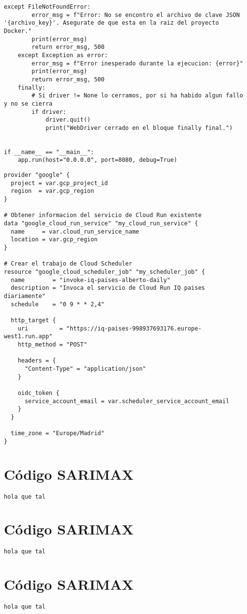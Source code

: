 \begin{lstlisting}[caption = {Código de web scrapping completo.}, label = WBSCode]
    except FileNotFoundError:
        error_msg = f"Error: No se encontro el archivo de clave JSON '{archivo_key}'. Asegurate de que esta en la raiz del proyecto Docker."
        print(error_msg)
        return error_msg, 500
    except Exception as error:
        error_msg = f"Error inesperado durante la ejecucion: {error}"
        print(error_msg)
        return error_msg, 500
    finally:
        # Si driver != None lo cerramos, por si ha habido algun fallo y no se cierra
        if driver:
            driver.quit()
            print("WebDriver cerrado en el bloque finally final.")


if __name__ == "__main__":
    app.run(host="0.0.0.0", port=8080, debug=True)
\end{lstlisting}


\begin{lstlisting}[caption = {Código de Terraform para el Google Scheduler.}, label = TFCode]
provider "google" {
  project = var.gcp_project_id
  region  = var.gcp_region
}

# Obtener informacion del servicio de Cloud Run existente
data "google_cloud_run_service" "my_cloud_run_service" {
  name     = var.cloud_run_service_name
  location = var.gcp_region
}

# Crear el trabajo de Cloud Scheduler
resource "google_cloud_scheduler_job" "my_scheduler_job" {
  name        = "invoke-iq-paises-alberto-daily"
  description = "Invoca el servicio de Cloud Run IQ paises diariamente"
  schedule    = "0 9 * * 2,4"

  http_target {
    uri         = "https://iq-paises-998937693176.europe-west1.run.app"
    http_method = "POST" 

	headers = {
      "Content-Type" = "application/json"
    }

    oidc_token {
      service_account_email = var.scheduler_service_account_email
    }
  }

  time_zone = "Europe/Madrid"
}
\end{lstlisting}
%
%
%
\section{Código SARIMAX}
%
%
%
\begin{lstlisting}[caption = {Código de modelo SARIMAX}, label = SARIMAX code]
hola que tal
\end{lstlisting}
%
%
%
\section{Código SARIMAX}
%
%
%
\begin{lstlisting}[caption = {Código de modelo SARIMAX}, label = SARIMAX code]
hola que tal
\end{lstlisting}
%
%
%
\section{Código SARIMAX}
%
%
%
\begin{lstlisting}[caption = {Código de modelo SARIMAX}, label = SARIMAX code]
hola que tal
\end{lstlisting}